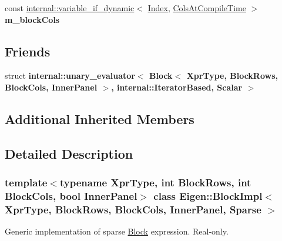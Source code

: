 \begin{DoxyCompactItemize}
\item 
\mbox{\label{class_eigen_1_1_block_impl_3_01_xpr_type_00_01_block_rows_00_01_block_cols_00_01_inner_panel_00_01_sparse_01_4_a660cab28430727dc43dd7715ef67fb06}} 
const \mbox{\hyperlink{class_eigen_1_1internal_1_1variable__if__dynamic}{internal\+::variable\+\_\+if\+\_\+dynamic}}$<$ \mbox{\hyperlink{struct_eigen_1_1_eigen_base_a554f30542cc2316add4b1ea0a492ff02}{Index}}, \mbox{\hyperlink{class_eigen_1_1_sparse_matrix_base_a11b30ed44f64a137b4fa1ee638ca2d36a27ba349f075d026c1f51d1ec69aa5b14}{Cols\+At\+Compile\+Time}} $>$ {\bfseries m\+\_\+block\+Cols}
\end{DoxyCompactItemize}
\subsection*{Friends}
\begin{DoxyCompactItemize}
\item 
\mbox{\label{class_eigen_1_1_block_impl_3_01_xpr_type_00_01_block_rows_00_01_block_cols_00_01_inner_panel_00_01_sparse_01_4_abbd5998ae9e753ee48f1d0540f134ba7}} 
struct {\bfseries internal\+::unary\+\_\+evaluator$<$ Block$<$ Xpr\+Type, Block\+Rows, Block\+Cols, Inner\+Panel $>$, internal\+::\+Iterator\+Based, Scalar $>$}
\end{DoxyCompactItemize}
\subsection*{Additional Inherited Members}


\subsection{Detailed Description}
\subsubsection*{template$<$typename Xpr\+Type, int Block\+Rows, int Block\+Cols, bool Inner\+Panel$>$\newline
class Eigen\+::\+Block\+Impl$<$ Xpr\+Type, Block\+Rows, Block\+Cols, Inner\+Panel, Sparse $>$}

Generic implementation of sparse \mbox{\hyperlink{class_eigen_1_1_block}{Block}} expression. Real-\/only. 

